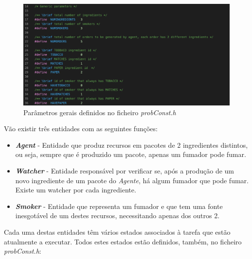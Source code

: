 \documentclass[10pt,portuguese]{article}
\begin{document}
\begin{figure}[!h]
    \centering
    \includegraphics[scale=0.5]{images/Problem/generalparame.png}
    \caption{Parâmetros gerais definidos no ficheiro \textit{probConst.h}}
\end{figure}

\clearpage

\par Vão existir três entidades com as seguintes funções:
\begin{itemize}
  \item \textit{\textbf{Agent}} - Entidade que produz recursos em pacotes de 2 ingredientes distintos, ou seja, sempre que é produzido um pacote, apenas um fumador pode fumar. 
  \item \textit{\textbf{Watcher}} - Entidade responsável por verificar se, após a produção de um novo ingrediente de um pacote do \textit{Agente}, há algum fumador que pode fumar. Existe um watcher por cada ingrediente.
  \item \textit{\textbf{Smoker}} - Entidade que representa um fumador e que tem uma fonte inesgotável de um destes recursos, necessitando apenas dos outros 2.
\end{itemize}
\par Cada uma destas entidades têm vários estados associados à tarefa que estão atualmente a executar. Todos estes estados estão definidos, também, no ficheiro \textit{probConst.h}:
\end{document}
